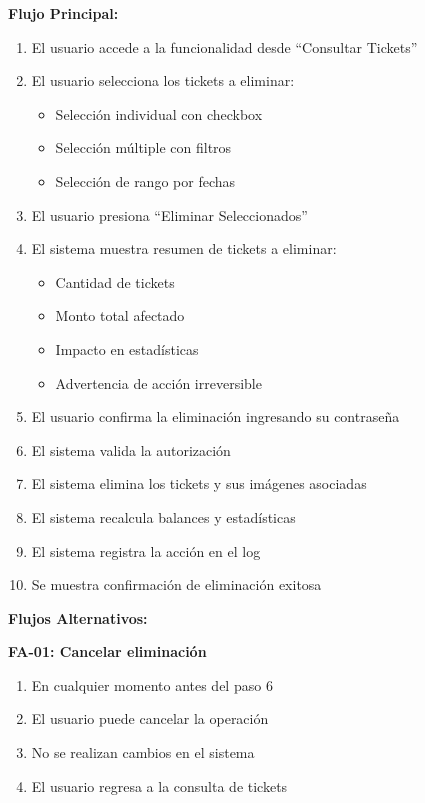 \noindent\textbf{Flujo Principal:}
\begin{enumerate}
    \item El usuario accede a la funcionalidad desde ``Consultar Tickets''
    \item El usuario selecciona los tickets a eliminar:
    \begin{itemize}
        \item Selección individual con checkbox
        \item Selección múltiple con filtros
        \item Selección de rango por fechas
    \end{itemize}
    \item El usuario presiona ``Eliminar Seleccionados''
    \item El sistema muestra resumen de tickets a eliminar:
    \begin{itemize}
        \item Cantidad de tickets
        \item Monto total afectado
        \item Impacto en estadísticas
        \item Advertencia de acción irreversible
    \end{itemize}
    \item El usuario confirma la eliminación ingresando su contraseña
    \item El sistema valida la autorización
    \item El sistema elimina los tickets y sus imágenes asociadas
    \item El sistema recalcula balances y estadísticas
    \item El sistema registra la acción en el log
    \item Se muestra confirmación de eliminación exitosa
\end{enumerate}

\noindent\textbf{Flujos Alternativos:}

\textbf{FA-01: Cancelar eliminación}
\begin{enumerate}
    \item En cualquier momento antes del paso 6
    \item El usuario puede cancelar la operación
    \item No se realizan cambios en el sistema
    \item El usuario regresa a la consulta de tickets
\end{enumerate}

